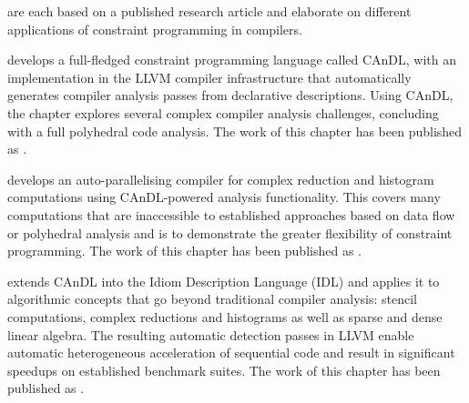     {\bf{}}
    are each based on a published research article and elaborate on different
    applications of constraint programming in compilers.

    {\bf{}} develops a full-fledged constraint programming
    language called CAnDL, with an implementation in the LLVM compiler
    infrastructure that automatically generates compiler analysis passes from
    declarative descriptions.
    Using CAnDL, the chapter explores several complex compiler analysis
    challenges, concluding with a full polyhedral code analysis.
    The work of this chapter has been published as
    {\bf\citet{Ginsbach:2018:CDS:3178372.3179515}}.

    {\bf{}} develops an auto-parallelising compiler for
    complex reduction and histogram computations using CAnDL-powered analysis
    functionality.
    This covers many computations that are inaccessible to established
    approaches based on data flow or polyhedral analysis and is to demonstrate
    the greater flexibility of constraint programming.
    The work of this chapter has been published as
    {\bf\citet{ginsbach2017discovery}}.

    {\bf{}} extends CAnDL into the Idiom Description Language
    (IDL) and applies it to algorithmic concepts that go beyond traditional
    compiler analysis: stencil computations, complex reductions and histograms
    as well as sparse and dense linear algebra.
    The resulting automatic detection passes in LLVM enable automatic
    heterogeneous acceleration of sequential code and result in significant
    speedups on established benchmark suites.
    The work of this chapter has been published as
    {\bf\citet{Ginsbach:2018:AML:3173162.3173182}}.

